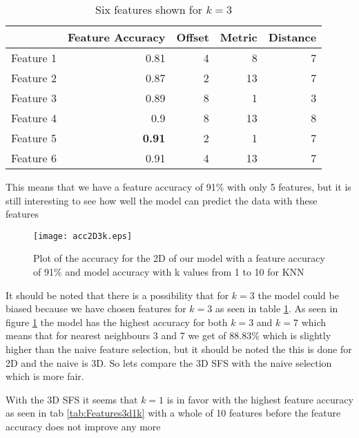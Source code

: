 \begin{table}[htbp]
  \centering
    \begin{tabular}{|r|r|r|r|r|}
    \hline
          & Feature Accuracy & Offset & Metric & Distance \\
    \hline
    Feature 1 & 0.81  & 4     & 8     & 7 \\
    \hline
    Feature 2 & 0.87  & 2     & 13    & 7 \\
    \hline
    Feature 3 & 0.89  & 8     & 1     & 3 \\
    \hline
    Feature 4 & 0.9   & 8     & 13    & 8 \\
    \hline
    Feature 5 & \textbf{0.91}  & 2     & 1     & 7 \\
    \hline
    Feature 6 & 0.91  & 4     & 13    & 7 \\
    \hline
    \end{tabular}%
    \caption{Six features shown for $k=3$}\label{tab:Features2d3k}%
\end{table}%

This means that we have a feature accuracy of 91\% with only 5 features, but it is still interesting to see how well the model can predict the data with these features

\begin{figure}[H]
  \centering
  \texttt{[image: acc2D3k.eps]}
  \caption{Plot of the accuracy for the 2D of our model with a feature accuracy of 91\% and model accuracy with k values from 1 to 10 for KNN}\label{fig:Features2d3k}
\end{figure}

It should be noted that there is a possibility that for $k=3$ the model could be biased because we have chosen features for $k=3$ as seen in table \ref{tab:Features2d3k}. As seen in figure \ref{fig:Features2d3k} the model has the highest accuracy for both $k=3$ and $k=7$ which means that for nearest neighbours 3 and 7 we get of 88.83\% which is slightly higher than the naive feature selection, but it should be noted the this is done for 2D and the naive is 3D. So lets compare the 3D SFS with the naive selection which is more fair.

With the 3D SFS it seems that $k=1$ is in favor with the highest feature accuracy as seen in tab \ref{tab:Features3d1k} with a whole of 10 features before the feature accuracy does not improve any more

